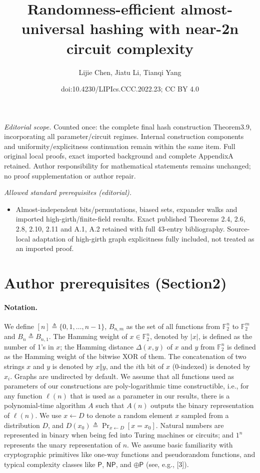 \documentclass[10pt,a4paper]{article}
\title{Randomness-efficient almost-universal hashing with near-2n circuit complexity}
\author{Lijie Chen, Jiatu Li, Tianqi Yang}
\date{doi:10.4230/LIPIcs.CCC.2022.23; CC BY 4.0}
\begin{document}
\maketitle
\noindent\textit{Editorial scope.} Counted once: the complete final hash construction Theorem3.9, incorporating all parameter/circuit regimes. Internal construction components and uniformity/explicitness continuation remain within the same item. Full original local proofs, exact imported background and complete AppendixA retained. Author responsibility for mathematical statements remains unchanged; no proof supplementation or author repair.\par\medskip
\noindent\textit{Allowed standard prerequisites (editorial).}\begin{itemize}
\item Almost-independent bits/permutations, biased sets, expander walks and imported high-girth/finite-field results. Exact published Theorems 2.4, 2.6, 2.8, 2.10, 2.11 and A.1, A.2 retained with full 43-entry bibliography. Source-local adaptation of high-girth graph explicitness fully included, not treated as an imported proof.
\end{itemize}\medskip
\section*{Author prerequisites (Section2)}
\paragraph{Notation.} We define $[n]\triangleq\{0,1,\ldots,n-1\}$, $B_{n,m}$ as the set of all functions from $\mathbb F_2^n$ to $\mathbb F_2^m$ and $B_n\triangleq B_{n,1}$. The Hamming weight of $x\in\mathbb F_2^n$, denoted by $|x|$, is defined as the number of 1's in $x$; the Hamming distance $\Delta(x,y)$ of $x$ and $y$ from $\mathbb F_2^n$ is defined as the Hamming weight of the bitwise XOR of them. The concatenation of two strings $x$ and $y$ is denoted by $x\Vert y$, and the $i$th bit of $x$ (0-indexed) is denoted by $x_i$. Graphs are undirected by default. We assume that all functions used as parameters of our constructions are poly-logarithmic time constructible, i.e., for any function $\ell(n)$ that is used as a parameter in our results, there is a polynomial-time algorithm $A$ such that $A(n)$ outputs the binary representation of $\ell(n)$.
We use $x\leftarrow D$ to denote a random element $x$ sampled from a distribution $D$, and $D(x_0)\triangleq\Pr_{x\leftarrow D}[x=x_0]$. Natural numbers are represented in binary when being fed into Turing machines or circuits; and $1^n$ represents the unary representation of $n$. We assume basic familiarity with cryptographic primitives like one-way functions and pseudorandom functions, and typical complexity classes like $\mathsf P$, $\mathsf{NP}$, and $\oplus\mathsf P$ (see, e.g., [3]).
\end{document}
